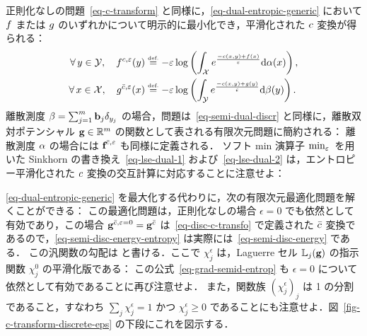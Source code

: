 正則化なしの問題~\eqref{eq-c-transform} と同様に，\eqref{eq-dual-entropic-generic} において $f$ または $g$ のいずれかについて明示的に最小化でき，平滑化された $c$ 変換が得られる：
\begin{align*}
	\forall \, y \in \mathcal{Y}, \quad
	f^{c,\varepsilon}(y) &\stackrel{\mbox{\upshape\tiny def.}}{=} - \varepsilon \log\left( 
			\int_{\mathcal{X}} e^{\frac{-c(x,y) + f(x)}{\varepsilon}} \mathrm{d}\alpha(x)
	 \right),\\
	\forall \, x \in \mathcal{X}, \quad
	g^{\bar{c},\varepsilon}(x) &\stackrel{\mbox{\upshape\tiny def.}}{=} - \varepsilon \log\left( 
			\int_{\mathcal{Y}} e^{\frac{-c(x,y) + g(y)}{\varepsilon}} \mathrm{d}\beta(y)
	 \right).
\end{align*}
離散測度 $\beta = \sum_{j=1}^m \mathrm{\textbf{b}}_j\delta_{y_j}$ の場合，問題は~\eqref{eq-semi-dual-discr} と同様に，離散双対ポテンシャル $\mathrm{\textbf{g}} \in \mathbb{R}^m$ の関数として表される有限次元問題に簡約される：
離散測度 $\alpha$ の場合には $\mathrm{\textbf{f}}^{\bar{c},\varepsilon}$ も同様に定義される．
%
ソフト min 演算子 $\text{min}_\varepsilon\,$ を用いた Sinkhorn の書き換え~\eqref{eq-lse-dual-1} および~\eqref{eq-lse-dual-2} は，エントロピー平滑化された $c$ 変換の交互計算に対応することに注意せよ：

\eqref{eq-dual-entropic-generic} を最大化する代わりに，次の有限次元最適化問題を解くことができる：
この最適化問題は，正則化なしの場合 $\epsilon=0$ でも依然として有効であり，この場合 $\mathrm{\textbf{g}}^{\bar{c},\varepsilon=0}=\mathrm{\textbf{g}}^{\bar{c}}$ は~\eqref{eq-disc-c-transfo} で定義された $\bar {c}$ 変換であるので，\eqref{eq-semi-disc-energy-entropy} は実際には~\eqref{eq-semi-disc-energy} である．
%
この汎関数の勾配は
と書ける．ここで $\chi_j^\epsilon$ は，Laguerre セル $\mathbb{L}_{j}(\mathrm{\textbf{g}})$ の指示関数 $\chi_j^0$ の平滑化版である：
この公式~\eqref{eq-grad-semid-entrop} も $\epsilon=0$ について依然として有効であることに再び注意せよ．
%
また，関数族 $( \chi_j^\epsilon )_j$ は 1 の分割であること，すなわち $\sum_j \chi_j^\epsilon=1$ かつ $\chi_j^\epsilon \geq 0$ であることにも注意せよ．図~\ref{fig-c-transform-discrete-eps} の下段にこれを図示する．

